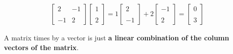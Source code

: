 \documentclass[]{article}
\begin{document}
\[
\begin{aligned}
\begin{bmatrix}2 & -1 \\\\ -1 & 2\end{bmatrix} \begin{bmatrix}1 \\\\ 2\end{bmatrix} = 1\begin{bmatrix}2 \\\\ -1\end{bmatrix} + 2\begin{bmatrix}-1 \\\\ 2\end{bmatrix} = \begin{bmatrix}0 \\\\ 3\end{bmatrix}
\end{aligned}
\]

A matrix times by a vector is just \textbf{a linear combination of the
column vectors of the matrix}.
\end{document}
